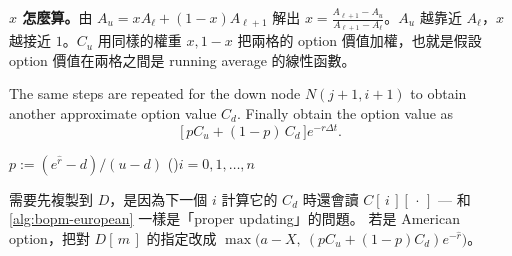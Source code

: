 \suppstart
{}

\begin{remark}
	\textbf{$x$ 怎麼算。}由 $A_{u}=xA_{\ell}+(1-x)A_{\ell+1}$ 解出 $x=\frac{A_{\ell+1}-A_{u}}{A_{\ell+1}-A_{\ell}}$。$A_{u}$ 越靠近 $A_{\ell}$，$x$ 越接近 $1$。$C_{u}$ 用同樣的權重 $x,1-x$ 把兩格的 option 價值加權，也就是假設 option 價值在兩格之間是 running average 的線性函數。
\end{remark}
\suppend
The same steps are repeated for the down node $N(j+1,i+1)$ to obtain another approximate option value $C_{d}$.
Finally obtain the option value as
\[
	\bigl[\,pC_{u}+(1-p)\,C_{d}\,\bigr]e^{-r\Delta t} .
\]

\suppstart
{}

\begin{algorithm}[H]
	\caption{Approximation algorithm for European arithmetic average-rate calls}
	\label{alg:asian}
	$p:=(e^{\hat{r}}-d)/(u-d)$\;
	\For(){$i=0,1,\ldots,n$}{
	}
	\;
\end{algorithm}


\begin{note}
	需要先複製到 $D$，是因為下一個 $i$ 計算它的 $C_{d}$ 時還會讀 $C[\,i\,][\,\cdot\,]$ --- 和 \autoref{alg:bopm-european} 一樣是「proper updating」的問題。
	若是 American option，把對 $D[\,m\,]$ 的指定改成 $\max\bigl(a-X,\ (pC_{u}+(1-p)C_{d})e^{-\hat{r}}\bigr)$。
\end{note}
\suppend


